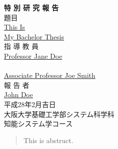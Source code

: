 \documentclass[a4j,12pt,oneside,openany,english]{jsbook}
\begin{document}
\thispagestyle{empty}
\begin{center}
\vspace*{5mm}
{\Huge {\bf 特 \hspace{12pt} 別 \hspace{12pt} 研 \hspace{12pt} 究 \hspace{12pt} 報 \hspace{12pt} 告}}\\
\vspace{2cm}
{\Large 題\hspace{8mm}目}\\
\vspace{1cm}
\underline{\LARGE{This Is}} \\
\vspace{0.5cm}
\underline{\LARGE{My Bachelor Thesis}} \\
\vspace{12mm}
{\large 指 導 教 員}\\
\vspace{6mm}
\underline{\Large Professor Jane Doe}\\
　\\
\underline{\Large Associate Professor Joe Smith}\\
\vspace{8mm}
{\large 報 告 者}\\
\vspace{6mm}
\underline{\Large John Doe}\\
\vspace{10mm}
{\Large 平成28年2月吉日}\\
\vspace{14mm}
{\Large 大阪大学基礎工学部システム科学科\\知能システム学コース}\\
\end{center}
\clearpage
\setcounter{page}{0}

\begin{abstract}
  This is abstruct.
\end{abstract}


\clearpage
\tableofcontents
\clearpage
\setcounter{page}{0}

\end{document}

